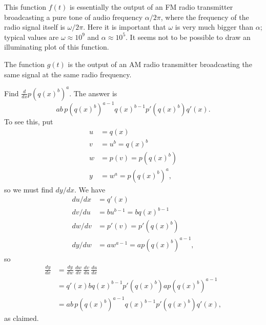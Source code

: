 \documentclass[a4paper]{book}
\newcommand{\al}        {\alpha}
\newcommand{\om}        {\omega}
\renewcommand{\:}{\colon}
\theoremstyle{definition}
\newenvironment{starex}{
 \renewcommand{\thetheorem}{\arabic{chapter}.\arabic{section}.\arabic{theorem}${}^*$}
 \exercise
}{\endexercise}
\renewenvironment{solution}{\SolutionInline}{\endSolutionInline}
\begin{document}
\begin{background}
 This function $f(t)$ is essentially the output of an FM radio
 transmitter broadcasting a pure tone of audio frequency $\al/2\pi$,
 where the frequency of the radio signal itself is $\om/2\pi$.  Here
 it is important that $\om$ is very much bigger than $\al$; typical
 values are $\om\approx 10^9$ and $\al\approx 10^5$.  It seems not to
 be possible to draw an illuminating plot of this function.

 The function $g(t)$ is the output of an AM radio transmitter
 broadcasting the same signal at the same radio frequency.
\end{background}
\begin{starex}
 Find $\frac{d}{dx}p(q(x)^b)^a$.
\end{starex}
\begin{solution}
 The answer is 
 \[ ab\, p(q(x)^b)^{a-1} q(x)^{b-1} p'(q(x)^b) q'(x). \]
 To see this, put
 \begin{align*}
  u &= q(x) \\
  v &= u^b = q(x)^b \\
  w &= p(v) = p(q(x)^b) \\
  y &= w^a = p(q(x)^b)^a,
 \end{align*}
 so we must find $dy/dx$.  We have
 \begin{align*}
  du/dx &= q'(x) \\
  dv/du &= bu^{b-1} = b q(x)^{b-1} \\
  dw/dv &= p'(v) = p'(q(x)^b) \\
  dy/dw &= a w^{a-1} = a p(q(x)^b)^{a-1},
 \end{align*}
 so 
 \begin{align*}
  \frac{dy}{dx} &= \frac{dy}{dw}\,\frac{dw}{dv}\,
                   \frac{dv}{du}\,\frac{du}{dx} \\
   &= q'(x) b q(x)^{b-1} p'(q(x)^b) a p(q(x)^b)^{a-1} \\
   &= ab\, p(q(x)^b)^{a-1} q(x)^{b-1} p'(q(x)^b) q'(x),
 \end{align*}
 as claimed.
\end{solution}
\end{document}

